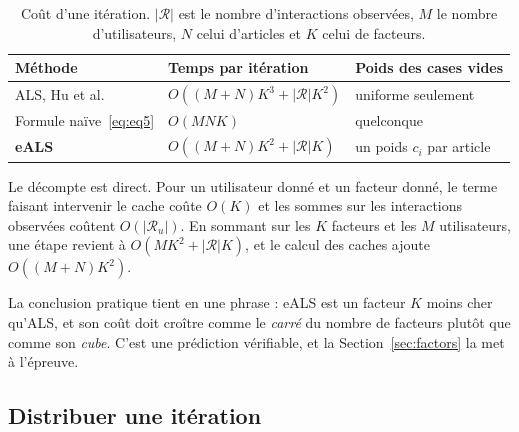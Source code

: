\documentclass[11pt,a4paper]{article}
\begin{document}
\begin{table}[h]
\centering\small
\caption{Coût d'une itération. $|\mathcal{R}|$ est le nombre d'interactions observées,
$M$ le nombre d'utilisateurs, $N$ celui d'articles et $K$ celui de
facteurs.}\label{tab:complexity}
\begin{tabular}{@{}lll@{}}
\toprule
Méthode & Temps par itération & Poids des cases vides \\
\midrule
ALS, Hu et al.~\cite{hu2008implicit} & $O((M+N)K^3+|\mathcal{R}|K^2)$ & uniforme seulement \\
Formule naïve~\eqref{eq:eq5}         & $O(MNK)$                       & quelconque \\
\textbf{eALS}~\cite{he2016eals}      & $O((M+N)K^2+|\mathcal{R}|K)$   & un poids $c_i$ par article \\
\bottomrule
\end{tabular}
\end{table}

Le décompte est direct. Pour un utilisateur donné et un facteur donné, le terme faisant
intervenir le cache coûte $O(K)$ et les sommes sur les interactions observées coûtent
$O(|\mathcal{R}_u|)$. En sommant sur les $K$ facteurs et les $M$ utilisateurs, une étape
revient à $O(MK^2+|\mathcal{R}|K)$, et le calcul des caches ajoute $O((M+N)K^2)$.

La conclusion pratique tient en une phrase : eALS est un facteur $K$ moins cher qu'ALS,
et son coût doit croître comme le \emph{carré} du nombre de facteurs plutôt que comme
son \emph{cube}. C'est une prédiction vérifiable, et la Section~\ref{sec:factors} la
met à l'épreuve.

\subsection{Distribuer une itération}\label{sec:algodist}
\end{document}

